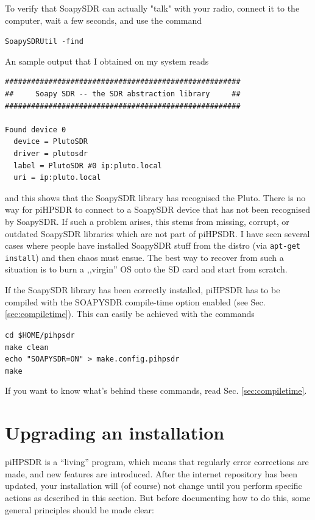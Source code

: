\documentclass[12pt]{book}
\def\grtt#1{\texttt{\color{magenta}#1}}
\def\pH{pi\-HPSDR\xspace}
\begin{document}
To verify that SoapySDR can actually "talk" with your radio, connect it to the computer,
wait a few seconds, and use the command

\grtt{SoapySDRUtil -find}

An sample output that I obtained on my system reads
\begin{scriptsize}
\begin{verbatim}
######################################################
##     Soapy SDR -- the SDR abstraction library     ##
######################################################

Found device 0
  device = PlutoSDR
  driver = plutosdr
  label = PlutoSDR #0 ip:pluto.local
  uri = ip:pluto.local
\end{verbatim}
\end{scriptsize}

and this shows that the SoapySDR library has recognised the Pluto.
There is no way for \pH to connect
to a SoapySDR device that has not been recognised by  SoapySDR. If such a problem arises, this
stems from missing, corrupt, or outdated SoapySDR libraries which are not part of \pH.
I have seen several cases where people have installed SoapySDR stuff from the distro
(via \grtt{apt-get install}) and then chaos must ensue. The best way to recover from such
a situation is to burn a ,,virgin''
OS onto the SD card and start from scratch.

\clearpage
If the SoapySDR library has been correctly installed, \pH has to be compiled with
the SOAPYSDR compile-time option enabled (see Sec. \ref{sec:compiletime}). This can
easily be achieved with the commands

\grtt{cd \$HOME/pihpsdr} \\
\grtt{make clean} \\
\grtt{echo "SOAPYSDR=ON" > make.config.pihpsdr} \\
\grtt{make}

If you want to know what's behind these commands, read Sec. \ref{sec:compiletime}.

\section{Upgrading an installation}
\pH is a ``living'' program, which means that regularly  error corrections are made, and new features are
introduced. After the internet repository has been updated, your installation will (of course) not change
until you perform specific actions as described in this section. But before documenting how to do this,
some general principles should be made clear:
\end{document}
